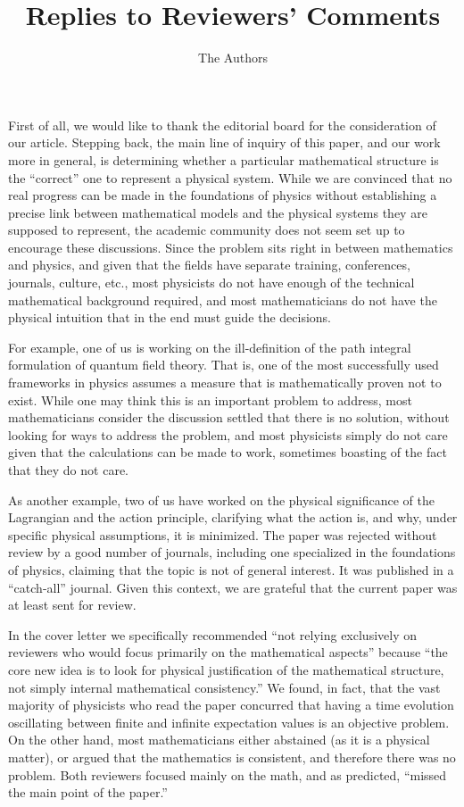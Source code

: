 \documentclass[11pt, executivepaper]{article}
\begin{document}
\title{\textbf{Replies to Reviewers' Comments}}

\author{The Authors}

\maketitle


\noindent First of all, we would like to thank the editorial board for the consideration of our article. Stepping back, the main line of inquiry of this paper, and our work more in general, is determining whether a particular mathematical structure is the ``correct'' one to represent a physical system. While we are convinced that no real progress can be made in the foundations of physics without establishing a precise link between mathematical models and the physical systems they are supposed to represent, the academic community does not seem set up to encourage these discussions. Since the problem sits right in between mathematics and physics, and given that the fields have separate training, conferences, journals, culture, etc.,  most physicists do not have enough of the technical mathematical background required, and most mathematicians do not have the physical intuition that in the end must guide the decisions.

For example, one of us is working on the ill-definition of the path integral formulation of quantum field theory. That is, one of the most successfully used frameworks in physics assumes a measure that is mathematically proven not to exist. While one may think this is an important problem to address, most mathematicians consider the discussion settled that there is no solution, without looking for ways to address the problem, and most physicists simply do not care given that the calculations can be made to work, sometimes boasting of the fact that they do not care.

As another example, two of us have worked on the physical significance of the Lagrangian and the action principle, clarifying what the action is, and why, under specific physical assumptions, it is minimized. The paper was rejected without review by a good number of journals, including one specialized in the foundations of physics, claiming that the topic is not of general interest. It was published in a ``catch-all'' journal. Given this context, we are grateful that the current paper was at least sent for review. 

In the cover letter we specifically recommended ``not relying exclusively on reviewers who would focus primarily on the mathematical aspects'' because ``the core new idea is to look for physical justification of the mathematical structure, not simply internal mathematical consistency.'' We found, in fact, that the vast majority of physicists who read the paper concurred that having a time evolution oscillating between finite and infinite expectation values is an objective problem. On the other hand, most mathematicians either abstained (as it is a physical matter), or argued that the mathematics is consistent, and therefore there was no problem. Both reviewers focused mainly on the math, and as predicted, ``missed the main point of the paper.''
\end{document}
